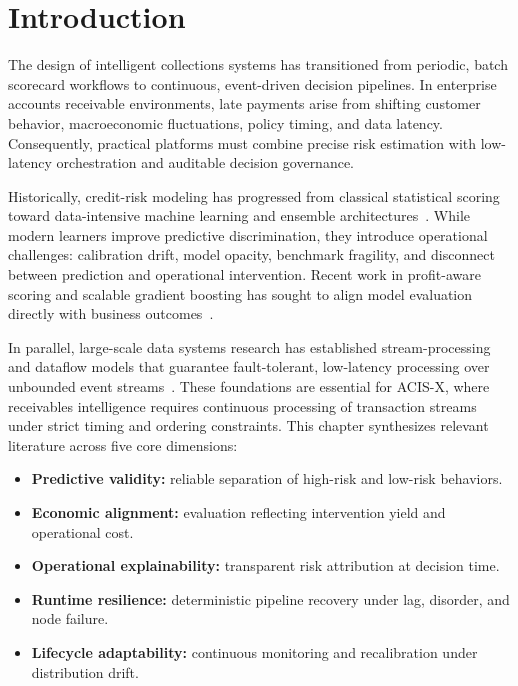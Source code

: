 \documentclass[a4paper, 12pt]{report}
\begin{document}
\section{Introduction}
The design of intelligent collections systems has transitioned from periodic, batch scorecard workflows to continuous, event-driven decision pipelines. In enterprise accounts receivable environments, late payments arise from shifting customer behavior, macroeconomic fluctuations, policy timing, and data latency. Consequently, practical platforms must combine precise risk estimation with low-latency orchestration and auditable decision governance.

Historically, credit-risk modeling has progressed from classical statistical scoring toward data-intensive machine learning and ensemble architectures~\cite{hand1997credit,thomas2000survey,baesens2003benchmarking,crook2007recent}. While modern learners improve predictive discrimination, they introduce operational challenges: calibration drift, model opacity, benchmark fragility, and disconnect between prediction and operational intervention. Recent work in profit-aware scoring and scalable gradient boosting has sought to align model evaluation directly with business outcomes~\cite{verbraken2014profit,chen2016xgboost}.

In parallel, large-scale data systems research has established stream-processing and dataflow models that guarantee fault-tolerant, low-latency processing over unbounded event streams~\cite{zaharia2013discretized,akidau2015dataflow}. These foundations are essential for ACIS-X, where receivables intelligence requires continuous processing of transaction streams under strict timing and ordering constraints. This chapter synthesizes relevant literature across five core dimensions:
\begin{itemize}[itemsep=2pt]
    \item \textbf{Predictive validity:} reliable separation of high-risk and low-risk behaviors.
    \item \textbf{Economic alignment:} evaluation reflecting intervention yield and operational cost.
    \item \textbf{Operational explainability:} transparent risk attribution at decision time.
    \item \textbf{Runtime resilience:} deterministic pipeline recovery under lag, disorder, and node failure.
    \item \textbf{Lifecycle adaptability:} continuous monitoring and recalibration under distribution drift.
\end{itemize}
\end{document}
